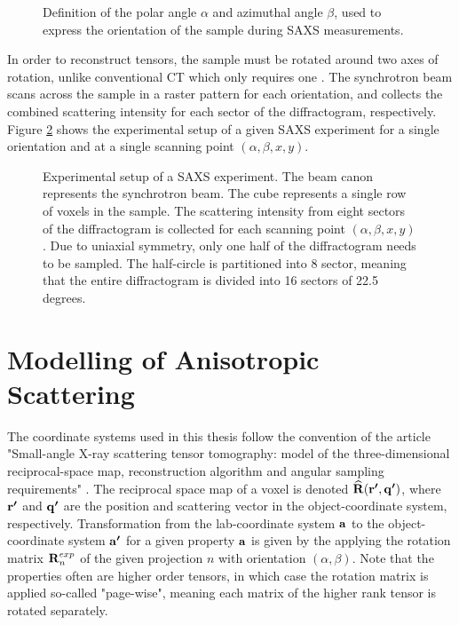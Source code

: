 \begin{figure}[h!]
    \centering
    
    \caption{Definition of the polar angle $\alpha$ and azimuthal angle $\beta$, used to express the orientation of the sample during SAXS measurements.}
    \label{fig:orientations}
\end{figure}

In order to reconstruct tensors, the sample must be rotated around two axes of rotation, unlike conventional CT which only requires one \cite{liebi2018small}.
The synchrotron beam scans across the sample in a raster pattern for each orientation, and collects the combined scattering intensity for each sector of the diffractogram, respectively.
Figure \ref{fig:experimental_setup} shows the experimental setup of a given SAXS experiment for a single orientation and at a single scanning point $(\alpha, \beta,x,y)$.

\begin{figure}
    \centering
    
    \caption{Experimental setup of a SAXS experiment. The beam canon represents the synchrotron beam. The cube represents a single row of voxels in the sample.
        The scattering intensity from eight sectors of the diffractogram is collected for each scanning point $(\alpha, \beta,x,y)$.
        Due to uniaxial symmetry, only one half of the diffractogram needs to be sampled. The half-circle is partitioned into 8 sector, meaning that the entire diffractogram is divided into 16 sectors of 22.5 degrees.}
    \label{fig:experimental_setup}
\end{figure}



\section{Modelling of Anisotropic Scattering}
The coordinate systems used in this thesis follow the convention of the article "Small-angle X-ray scattering tensor tomography:
model of the three-dimensional reciprocal-space
map, reconstruction algorithm and angular
sampling requirements" \cite{liebi2018small}.
The reciprocal space map of a voxel is denoted $\bm{\mathrm{\widehat{R}}}(\bm{\mathrm{r'}}, \bm{\mathrm{q'}})$,
where $\bm{\mathrm{r'}}$ and $\bm{\mathrm{q'}}$ are the position and scattering vector in the object-coordinate system, respectively.
Transformation from the lab-coordinate system $\bm{\mathrm{a}}$ to the object-coordinate system $\bm{\mathrm{a'}}$ for a given property $\bm{\mathrm{a}}$
is given by the applying the rotation matrix $\bm{\mathrm{R}}_{n}^{exp}$ of the given projection $n$ with orientation $\left(\alpha,\beta\right)$.
Note that the properties often are higher order tensors, in which case the rotation matrix is applied so-called "page-wise",
meaning each matrix of the higher rank tensor is rotated separately.

